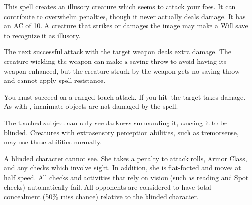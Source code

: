 \spellrng{\rngmed}
\begin{spelleffect}
This spell creates an illusory creature which seems to attack your foes. It can contribute to overwhelm penalties, though it never actually deals damage. It has an AC of 10. A creature that strikes or damages the image may make a Will save to recognize it as illusory.
\end{spelleffect}

\spellrng{\rngclose}
\begin{spelleffect}
The next successful attack with the target weapon deals extra damage. The creature wielding the weapon can make a saving throw to avoid having its weapon enhanced, but the creature struck by the weapon gets no saving throw and cannot apply spell resistance.
\end{spelleffect}

\spellrng{\rngclose}
\begin{spelleffect}
You must succeed on a ranged touch attack. If you hit, the target takes damage. As with , inanimate objects are not damaged by the spell.
\end{spelleffect}

\begin{spelleffect}
  The touched subject can only see darkness surrounding it, causing it to be blinded. Creatures with extrasensory perception abilities, such as tremorsense, may use those abilities normally.
\end{spelleffect}
\begin{spellnotes}
   A blinded character cannot see. She takes a  penalty to attack rolls, Armor Class, and any checks which involve sight. In addition, she is flat-footed and moves at half speed. All checks and activities that rely on vision (such as reading and Spot checks) automatically fail. All opponents are considered to have total concealment (50\% miss chance) relative to the blinded character.
\end{spellnotes}

